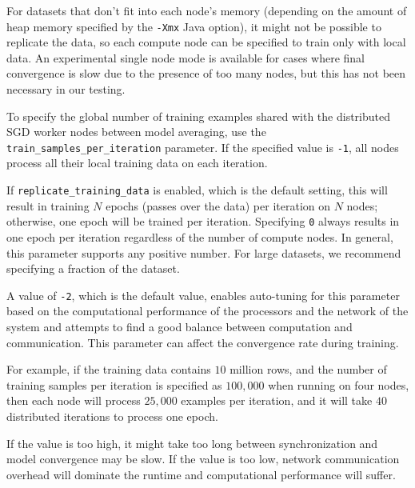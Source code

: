 For datasets that don't fit into each node's memory (depending on the amount of heap memory specified by the \texttt{-Xmx} Java %
option), it might not be possible to replicate the data, so each compute node can be specified to train only with local data. An experimental single node mode is available for cases where final convergence is slow due to the presence of too many nodes, but this has not been necessary in our testing.

To specify the global number of training examples shared with the distributed SGD worker nodes between model averaging, use the \\ \texttt{train\_samples\_per\_iteration} parameter. If the specified value is \texttt{-1}, all nodes process all their local training data on each iteration. 

If \texttt{replicate\_training\_data} is enabled, which is the default setting, this will result in training $N$ epochs (passes over the data) per iteration on $N$ nodes; otherwise, one epoch will be trained per iteration. Specifying \texttt{0} always results in one epoch per iteration regardless of the number of compute nodes. In general, this parameter supports any positive number. For large datasets, we recommend specifying a fraction of the dataset. 

A value of \texttt{-2}, which is the default value, enables auto-tuning for this parameter based on the computational performance of the processors and the network of the system and attempts to find a good balance between computation and communication. This parameter can affect the convergence rate during training.

For example, if the training data contains $10$ million rows, and the number of training samples per iteration is specified as $100,000$ when running on four nodes, then each node will process $25,000$ examples per iteration, and it will take $40$ distributed iterations to process one epoch. 

If the value is too high, it might take too long between synchronization and model convergence may be slow.  If the value is too low, network communication overhead will dominate the runtime and computational performance will suffer. 


\noindent
